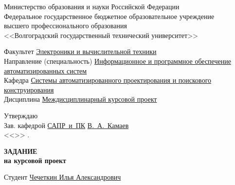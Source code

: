 \begin{titlepage}
    \begin{center}
        Министерство образования и науки Российской Федерации \\
        Федеральное государственное бюджетное образовательное учреждение\\
        высшего профессионального образования\\
        <<Волгоградский государственный технический университет>>\\
    \end{center}
    Факультет \underline{\hspace{1cm}Электроники и вычислительной техники\hspace{4.75cm}}\\
    Направление (специальность) \underline{Информационное и программное обеспечение\hspace{0.2cm}}\\
    \underline{автоматизированных систем\hspace{10.8cm}}\\
    Кафедра \underline{\hspace{1.4cm}Системы автоматизированного проектирования и поискового\hspace{0.3cm}}\\
    \underline{конструирования\hspace{13.3cm}}\\
    Дисциплина \underline{\hspace{1cm}Междисциплинарный курсовой проект}
    \begin{flushright}
        Утверждаю\\
        Зав. кафедрой \underline{САПР~и~ПК} \hspace{0.2cm} \underline{В.~А.~Камаев} \\
        <<\underline{\hspace{2cm}}>>\underline{\hspace{5cm}} \the{}.
    \end{flushright}
    \begin{center}
        \large \MakeUppercase{\textbf{задание}} \\
        \normalsize\vspace{-0.2cm}\textbf{на курсовой проект}
    \end{center}
    \begin{flushleft}
        Студент \underline{\hspace{1cm}Чечеткин Илья Александрович\hspace{2cm}}\\

\end{flushleft}
\end{titlepage}
